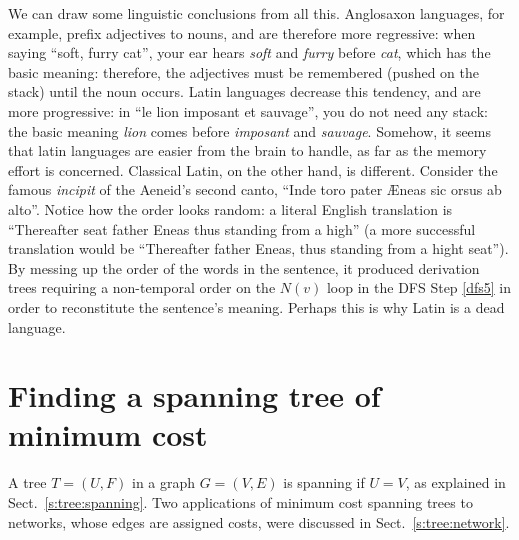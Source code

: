 \documentclass[a4paper]{book}
\theoremstyle{changebreak}                %
\begin{document}
We can draw some linguistic conclusions from all this. Anglosaxon
languages, for example, prefix adjectives to nouns, and are therefore
more regressive: when saying ``soft, furry cat'', your ear hears {\it
  soft} and {\it furry} before {\it cat}, which has the basic meaning:
therefore, the adjectives must be remembered (pushed on the stack)
until the noun occurs. Latin languages decrease this tendency, and are
more progressive: in ``le lion imposant et sauvage'', you do not need
any stack: the basic meaning {\it lion} comes before {\it imposant}
and {\it sauvage}. Somehow, it seems that latin languages are easier
from the brain to handle, as far as the memory effort is
concerned. Classical Latin, on the other hand, is different. Consider
the famous {\it incipit} of the Aeneid's second canto, ``Inde toro
pater {\AE}neas sic orsus ab alto''. Notice how the order looks
random: a literal English translation is ``Thereafter seat father
Eneas thus standing from a high'' (a more successful translation would
be ``Thereafter father Eneas, thus standing from a hight seat''). By
messing up the order of the words in the sentence, it produced
derivation trees requiring a non-temporal order on the $N(v)$ loop in
the DFS Step \ref{dfs5} in order to reconstitute the sentence's
meaning. Perhaps this is why Latin is a dead language.

\section{Finding a spanning tree of minimum cost}
A tree $T=(U,F)$ in a graph $G=(V,E)$ is
spanning if $U=V$, as explained
in Sect.~\ref{s:tree:spanning}. Two applications of minimum
cost spanning trees to networks, whose edges are
assigned costs, were discussed in Sect.~\ref{s:tree:network}. 
\end{document}
